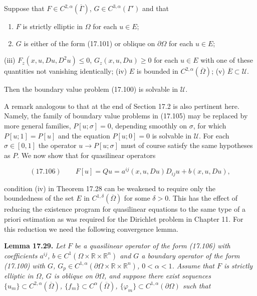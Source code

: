 Suppose that $F \in C^{2,\alpha}(\overline{\Gamma})$, $G \in C^{3,\alpha}(\Gamma')$ and that

\begin{enumerate}
\item[(i)] $F$ is strictly elliptic in $\Omega$ for each $u \in E$;
\item[(ii)] $G$ is either of the form (17.101) or oblique on $\partial\Omega$ for each $u \in E$;
\end{enumerate}



(iii) $F_z(x, u, Du, D^2u) \leq 0$, $G_z(x, u, Du) \geq 0$ for each $u \in E$ with one of these
quantities not vanishing identically;
(iv) $E$ is bounded in $C^{2,\alpha}(\overline{\Omega})$;
(v) $\overline{E} \subset \mathcal{U}$.

Then the boundary value problem (17.100) is solvable in $\mathcal{U}$.

    A remark analogous to that at the end of Section 17.2 is also pertinent here.
Namely, the family of boundary value problems in (17.105) may be replaced by
more general families, $P[u;\sigma] = 0$, depending smoothly on $\sigma$, for which $P[u; 1] =
P[u]$ and the equation $P[u; 0] = 0$ is solvable in $\mathcal{U}$. For each $\sigma \in [0, 1]$ the operator
$u \to P[u;\sigma]$ must of course satisfy the same hypotheses as $P$.
    We now show that for quasilinear operators

\[
(17.106)\qquad F[u] = Qu = a^{ij}(x, u, Du)D_{ij}u + b(x, u, Du),
\]

condition (iv) in Theorem 17.28 can be weakened to require only the boundedness
of the set $E$ in $C^{1,\delta}(\overline{\Omega})$ for some $\delta > 0$. This has the effect of reducing the existence
program for quasilinear equations to the same type of a priori estimation as was
required for the Dirichlet problem in Chapter 11. For this reduction we need the
following convergence lemma.

\textbf{Lemma 17.29.} \textit{Let $F$ be a quasilinear operator of the form (17.106) with coefficients
$a^{ij}$, $b \in C^1(\Omega \times \mathbb{R} \times \mathbb{R}^n)$ and $G$ a boundary operator of the form (17.100) with $G$,
$G_p \in C^{1,\alpha}(\partial\Omega \times \mathbb{R} \times \mathbb{R}^n)$, $0 < \alpha < 1$. Assume that $F$ is strictly elliptic in $\Omega$, $G$ is
oblique on $\partial\Omega$, and suppose there exist sequences $\{u_m\} \subset C^{2,\alpha}(\overline{\Omega})$, $\{f_m\} \subset C^\alpha(\overline{\Omega})$,
$\{\varphi_m\} \subset C^{1,\alpha}(\partial\Omega)$ such that}

